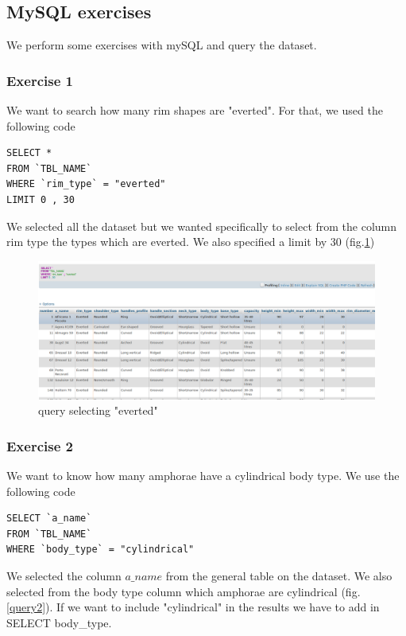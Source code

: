 \documentclass[10pt,a4paper]{article}
\begin{document}
\subsection{MySQL exercises}

We perform some exercises with mySQL and query the dataset. 

\subsubsection{Exercise 1}

We want to search how many rim shapes are "everted". For that, we used the following code

\begin{verbatim}
SELECT *
FROM `TBL_NAME`
WHERE `rim_type` = "everted"
LIMIT 0 , 30
\end{verbatim}


We selected all the dataset but we wanted specifically to select from the column rim type the types which are everted. We also specified a limit by 30 (fig.\ref{query1})

\begin{figure}[htp]
     \centering
\includegraphics[scale=0.30]{output_query1.png}
\caption{query selecting "everted"}
\label{query1}

\end{figure} 


\subsubsection{Exercise 2}

We want to know how many amphorae have a cylindrical body type. We use the following code

\begin{verbatim}
SELECT `a_name`
FROM `TBL_NAME`
WHERE `body_type` = "cylindrical"
\end{verbatim}

We selected the column $a\_name$ from the general table on the dataset. We also selected from the body type column which amphorae are cylindrical (fig. \ref{query2}). If we want to include "cylindrical" in the results we have to add in SELECT body\_type.
\end{document}
